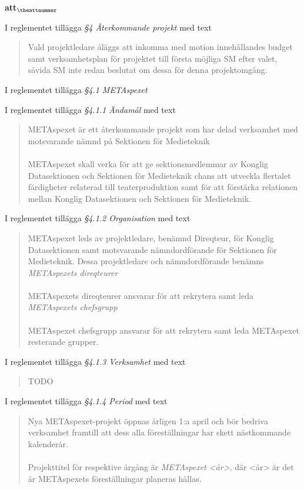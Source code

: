 \documentclass[a4paper]{article}
\begin{document}
\setcounter{attnummer}{1}
\begin{list}{\bf att$_{\theattnummer}$}{}


\item I reglementet tillägga \textit{\S4 Återkommande projekt} med text \begin{quote} Vald projektledare åläggs att inkomma med motion innehållandes budget samt verksamhetsplan för projektet till första möjliga SM efter valet, såvida SM inte redan beslutat om dessa för denna projektomgång. \end{quote}


\item I reglementet tillägga \textit{\S4.1 METAspexet}
\item I reglementet tillägga \textit{\S4.1.1 Ändamål} med text \begin{quote} METAspexet är ett återkommande projekt som har delad verksamhet med motsvarande nämnd på Sektionen för Medieteknik\\\\METAspexet skall verka för att ge sektionsmedlemmar av Konglig Datasektionen och Sektionen för Medieteknik chans att utveckla flertalet färdigheter relaterad till teaterproduktion samt för att förstärka relationen mellan Konglig Datasektionen och Sektionen för Medieteknik. \end{quote}
\item I reglementet tillägga \textit{\S4.1.2 Organisation} med text \begin{quote} METAspexet leds av projektledare, benämnd Direqteur, för Konglig Datasektionen samt motsvarande nämndordförande för Sektionen för Medieteknik. Dessa projektledare och nämndordförande benämns \textit{METAspexets direqteurer}\\\\METAspexets direqteurer ansvarar för att rekrytera samt leda \textit{METAspexets chefsgrupp}\\\\METAspexet chefsgrupp ansvarar för att rekrytera samt leda METAspexet resterande grupper.\end{quote}
\item I reglementet tillägga \textit{\S4.1.3 Verksamhet} med text \begin{quote} TODO \end{quote}
\item I reglementet tillägga \textit{\S4.1.4 Period} med text \begin{quote} Nya METAspexet-projekt öppnas årligen 1:a april och bör bedriva verksamhet framtill att dess alla föreställningar har skett nästkommande kalenderår.\\\\Projekttitel för respektive årgång är \textit{METAspexet <år>}, där <år> är det år METAspexets föreställningar planeras hållas.\end{quote}


\end{list}
\end{document}
